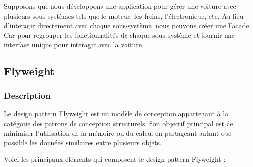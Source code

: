 \documentclass[french]{article}
\begin{document}
Supposons que nous développons une application pour gérer une voiture avec plusieurs sous-systèmes tels que le moteur, les freins, l'électronique, etc. Au lieu d'interagir directement avec chaque sous-système, nous pouvons créer une Facade Car pour regrouper les fonctionnalités de chaque sous-système et fournir une interface unique pour interagir avec la voiture.




\newpage

\subsection{Flyweight}

\subsubsection{Description}

Le design pattern Flyweight est un modèle de conception appartenant à la catégorie des patrons de conception structurels. Son objectif principal est de minimiser l'utilisation de la mémoire ou du calcul en partageant autant que possible les données similaires entre plusieurs objets.

Voici les principaux éléments qui composent le design pattern Flyweight :
\end{document}
